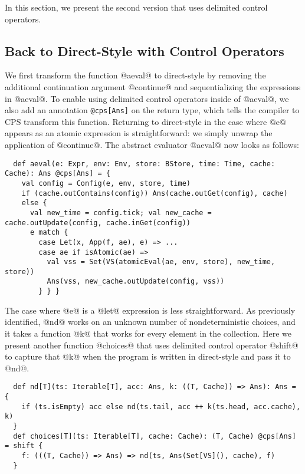\documentclass[acmsmall, screen]{acmart}\settopmatter{}
\begin{document}
In this section, we present the second version that uses delimited control operators.

\subsection{Back to Direct-Style with Control Operators} \label{uncps}

We first transform the function @aeval@ to direct-style by removing the additional
continuation argument @continue@ and sequentializing the expressions in @aeval@.
To enable using delimited control operators inside of @aeval@, we also add an
annotation \verb|@cps[Ans]| on the return type, which tells the compiler to CPS
transform this function.
Returning to direct-style in the case where @e@ appears as an atomic expression is straightforward:
we simply unwrap the application of @continue@. The abstract evaluator @aeval@ now looks as follows:

\begin{lstlisting}
  def aeval(e: Expr, env: Env, store: BStore, time: Time, cache: Cache): Ans @cps[Ans] = {
    val config = Config(e, env, store, time)
    if (cache.outContains(config)) Ans(cache.outGet(config), cache)
    else {
      val new_time = config.tick; val new_cache = cache.outUpdate(config, cache.inGet(config))
      e match {
        case Let(x, App(f, ae), e) => ...
        case ae if isAtomic(ae) =>
          val vss = Set(VS(atomicEval(ae, env, store), new_time, store))
          Ans(vss, new_cache.outUpdate(config, vss))
        } } }
\end{lstlisting}

The case where @e@ is a @let@ expression is less straightforward. As
previously identified, @nd@ works on an unknown number of
nondeterministic choices, and it takes a
function @k@ that works for every element in the collection. Here we present another
function @choices@ that uses delimited control operator @shift@ to capture that @k@
when the program is written in direct-style and pass it to @nd@.

\begin{lstlisting}
  def nd[T](ts: Iterable[T], acc: Ans, k: ((T, Cache)) => Ans): Ans = {
    if (ts.isEmpty) acc else nd(ts.tail, acc ++ k(ts.head, acc.cache), k)
  }
  def choices[T](ts: Iterable[T], cache: Cache): (T, Cache) @cps[Ans] = shift {
    f: (((T, Cache)) => Ans) => nd(ts, Ans(Set[VS](), cache), f)
  }
\end{lstlisting}
\end{document}
